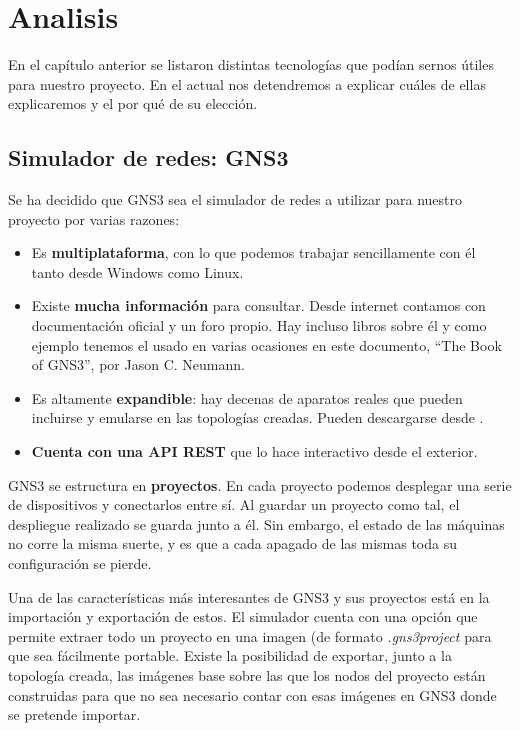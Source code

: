 \chapter{Analisis}\label{chap:Analisis}
En el capítulo anterior se listaron distintas tecnologías que podían sernos útiles para nuestro proyecto. En el actual nos detendremos a explicar cuáles de ellas explicaremos y el por qué de su elección.

\section{Simulador de redes: GNS3}
Se ha decidido que GNS3 sea el simulador de redes a utilizar para nuestro proyecto por varias razones:
\begin{itemize}
\item Es \textbf{multiplataforma}, con lo que podemos trabajar sencillamente con él tanto desde Windows como Linux.
\item Existe \textbf{mucha información} para consultar. Desde internet contamos con documentación oficial y un foro propio. Hay incluso libros sobre él y como ejemplo tenemos el usado en varias ocasiones en este documento, ``The Book of GNS3'', por Jason C. Neumann.
\item Es altamente \textbf{expandible}: hay decenas de aparatos reales que pueden incluirse y emularse en las topologías creadas. Pueden descargarse desde .
\item \textbf{Cuenta con una API REST} que lo hace interactivo desde el exterior.
\end{itemize}

GNS3 se estructura en \textbf{proyectos}. En cada proyecto podemos desplegar una serie de dispositivos y conectarlos entre sí. Al guardar un proyecto como tal, el despliegue realizado se guarda junto a él. Sin embargo, el estado de las máquinas no corre la misma suerte, y es que a cada apagado de las mismas toda su configuración se pierde.

Una de las características más interesantes de GNS3 y sus proyectos está en la importación y exportación de estos. El simulador cuenta con una opción que permite extraer todo un proyecto en una imagen (de formato \textit{.gns3project} para que sea fácilmente portable. Existe la posibilidad de exportar, junto a la topología creada, las imágenes base sobre las que los nodos del proyecto están construidas para que no sea necesario contar con esas imágenes en GNS3 donde se pretende importar.

